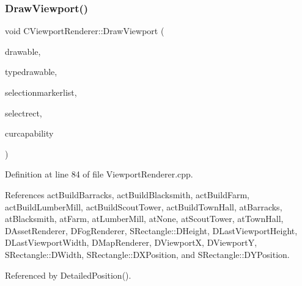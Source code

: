 \subsubsection{\texorpdfstring{Draw\+Viewport()}{DrawViewport()}}
{\footnotesize\ttfamily void C\+Viewport\+Renderer\+::\+Draw\+Viewport (\begin{DoxyParamCaption}\item[{Gdk\+Drawable $\ast$}]{drawable,  }\item[{Gdk\+Drawable $\ast$}]{typedrawable,  }\item[{const std\+::list$<$ std\+::weak\+\_\+ptr$<$ \hyperlink{classCPlayerAsset}{C\+Player\+Asset} $>$ $>$ \&}]{selectionmarkerlist,  }\item[{const \hyperlink{structSRectangle}{S\+Rectangle} \&}]{selectrect,  }\item[{\hyperlink{GameDataTypes_8h_a35b98ce26aca678b03c6f9f76e4778ce}{E\+Asset\+Capability\+Type}}]{curcapability }\end{DoxyParamCaption})}



Definition at line 84 of file Viewport\+Renderer.\+cpp.



References act\+Build\+Barracks, act\+Build\+Blacksmith, act\+Build\+Farm, act\+Build\+Lumber\+Mill, act\+Build\+Scout\+Tower, act\+Build\+Town\+Hall, at\+Barracks, at\+Blacksmith, at\+Farm, at\+Lumber\+Mill, at\+None, at\+Scout\+Tower, at\+Town\+Hall, D\+Asset\+Renderer, D\+Fog\+Renderer, S\+Rectangle\+::\+D\+Height, D\+Last\+Viewport\+Height, D\+Last\+Viewport\+Width, D\+Map\+Renderer, D\+ViewportX, D\+ViewportY, S\+Rectangle\+::\+D\+Width, S\+Rectangle\+::\+D\+X\+Position, and S\+Rectangle\+::\+D\+Y\+Position.



Referenced by Detailed\+Position().


